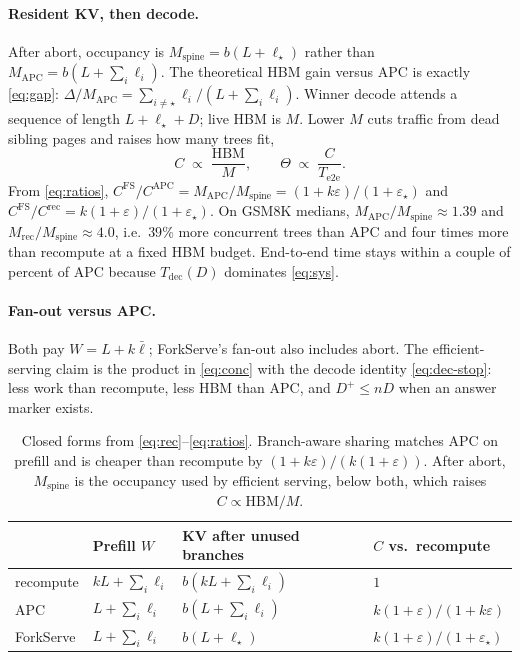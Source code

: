 \documentclass[11pt,a4paper]{article}
\begin{document}
\paragraph{Resident KV, then decode.}
After abort, occupancy is $M_{\mathrm{spine}}=b(L+\ell_{\star})$ rather than $M_{\mathrm{APC}}=b(L+\sum_i\ell_i)$.
The theoretical HBM gain versus APC is exactly \eqref{eq:gap}:
$\Delta/M_{\mathrm{APC}}=\sum_{i\neq\star}\ell_i\big/(L+\sum_i\ell_i)$.
Winner decode attends a sequence of length $L+\ell_{\star}+D$; live HBM is $M$.
Lower $M$ cuts traffic from dead sibling pages and raises how many trees fit,
\begin{equation}
\label{eq:conc}
C
  \;\propto\;
  \frac{\mathrm{HBM}}{M},
\qquad
\Theta
  \;\propto\;
  \frac{C}{T_{\mathrm{e2e}}}.
\end{equation}
From \eqref{eq:ratios}, $C^{\mathrm{FS}}/C^{\mathrm{APC}}=M_{\mathrm{APC}}/M_{\mathrm{spine}}=(1+k\varepsilon)/(1+\varepsilon_{\star})$
and $C^{\mathrm{FS}}/C^{\mathrm{rec}}=k(1+\varepsilon)/(1+\varepsilon_{\star})$.
On GSM8K medians, $M_{\mathrm{APC}}/M_{\mathrm{spine}}\approx 1.39$ and $M_{\mathrm{rec}}/M_{\mathrm{spine}}\approx 4.0$,
i.e.\ $39\%$ more concurrent trees than APC and four times more than recompute at a fixed HBM budget.
End-to-end time stays within a couple of percent of APC because $T_{\mathrm{dec}}(D)$ dominates \eqref{eq:sys}.

\paragraph{Fan-out versus APC.}
Both pay $W=L+k\bar\ell$; ForkServe's fan-out also includes abort.
The efficient-serving claim is the product in \eqref{eq:conc} with the decode identity \eqref{eq:dec-stop}: less work than recompute, less HBM than APC, and $D^{+}\le nD$ when an answer marker exists.

\begin{table}[h]
\centering
\small
\begin{tabular}{@{}l
>{\raggedright\arraybackslash}p{}
>{\raggedright\arraybackslash}p{}
>{\raggedright\arraybackslash}p{}@{}}
\toprule
 & Prefill $W$ & KV after unused branches & $C$ vs.\ recompute \\
\midrule
recompute & $kL+\sum_i\ell_i$ & $b(kL+\sum_i\ell_i)$ & $1$ \\
APC & $L+\sum_i\ell_i$ & $b(L+\sum_i\ell_i)$ & $k(1+\varepsilon)/(1+k\varepsilon)$ \\
ForkServe & $L+\sum_i\ell_i$ & $b(L+\ell_{\star})$ & $k(1+\varepsilon)/(1+\varepsilon_{\star})$ \\
\bottomrule
\end{tabular}
\caption{Closed forms from \eqref{eq:rec}--\eqref{eq:ratios}.
Branch-aware sharing matches APC on prefill and is cheaper than recompute by $(1+k\varepsilon)/(k(1+\varepsilon))$.
After abort, $M_{\mathrm{spine}}$ is the occupancy used by efficient serving, below both, which raises $C\propto\mathrm{HBM}/M$.}
\end{table}
\end{document}
